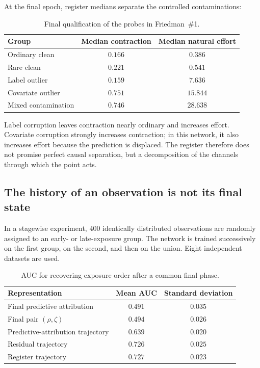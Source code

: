 At the final epoch, register medians separate the controlled contaminations:
\begin{table}[H]
\centering
\caption{Final qualification of the probes in Friedman~\#1.}
\label{tab:nonlinear-groups}
\small
\begin{tabular}{@{}lcc@{}}
\toprule
Group & Median contraction & Median natural effort \\
\midrule
Ordinary clean & $0.166$ & $0.386$ \\
Rare clean & $0.221$ & $0.541$ \\
Label outlier & $0.159$ & $7.636$ \\
Covariate outlier & $0.751$ & $15.844$ \\
Mixed contamination & $0.746$ & $28.638$ \\
\bottomrule
\end{tabular}
\end{table}
Label corruption leaves contraction nearly ordinary and increases effort. Covariate corruption strongly increases contraction; in this network, it also increases effort because the prediction is displaced. The register therefore does not promise perfect causal separation, but a decomposition of the channels through which the point acts.

\subsection{The history of an observation is not its final state}
In a stagewise experiment, $400$ identically distributed observations are randomly assigned to an early- or late-exposure group. The network is trained successively on the first group, on the second, and then on the union. Eight independent datasets are used.

\begin{table}[H]
\centering
\caption{AUC for recovering exposure order after a common final phase.}
\label{tab:stagewise}
\small
\begin{tabular}{@{}lcc@{}}
\toprule
Representation & Mean AUC & Standard deviation \\
\midrule
Final predictive attribution & $0.491$ & $0.035$ \\
Final pair $(\rho,\zeta)$ & $0.494$ & $0.026$ \\
Predictive-attribution trajectory & $0.639$ & $0.020$ \\
Residual trajectory & $0.726$ & $0.025$ \\
Register trajectory & $0.727$ & $0.023$ \\
\bottomrule
\end{tabular}
\end{table}

